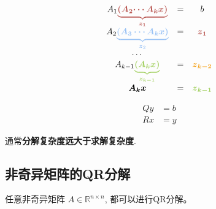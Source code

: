 \begin{example}[求解k个线性方程组 $ A_{1} A_{2} \cdots A_{k} x=b $]
    \begin{equation}\displaystyle \begin{matrix}
        A_{1}\textcolor[rgb]{0.72,0.33,0.31}{\boldsymbol{\underbrace{\boldsymbol{\textcolor[rgb]{0.72,0.33,0.31}{(}\textcolor[rgb]{0.72,0.33,0.31}{A}\textcolor[rgb]{0.72,0.33,0.31}{_{2}}\textcolor[rgb]{0.72,0.33,0.31}{\cdots A}\textcolor[rgb]{0.72,0.33,0.31}{_{k}}\textcolor[rgb]{0.72,0.33,0.31}{x}\textcolor[rgb]{0.72,0.33,0.31}{)}}}_{z_{1}}}} & = & b\\
        \textcolor[rgb]{0,0,0}{A}\textcolor[rgb]{0,0,0}{_{2}}\textcolor[rgb]{0.6,0.76,0.96}{\underbrace{\boldsymbol{( A_{3} \cdots A_{k} x)}}_{\boldsymbol{z_{2}}}} & = & \boldsymbol{\textcolor[rgb]{0.72,0.33,0.31}{z}\textcolor[rgb]{0.72,0.33,0.31}{_{1}}}\\
        \cdots  &  & \\
        A_{k-1}\textcolor[rgb]{0.63,0.81,0.37}{\boldsymbol{\underbrace{(\textcolor[rgb]{0.63,0.81,0.37}{A}\textcolor[rgb]{0.63,0.81,0.37}{_{k}}\textcolor[rgb]{0.63,0.81,0.37}{x}\textcolor[rgb]{0.63,0.81,0.37}{)}}_{z_{k-1}}}} & = & \boldsymbol{\textcolor[rgb]{0.96,0.65,0.14}{z}\textcolor[rgb]{0.96,0.65,0.14}{_{k-2}}}\\
        \boldsymbol{A_{k} x} & = & \boldsymbol{\textcolor[rgb]{0.63,0.81,0.37}{z}\textcolor[rgb]{0.63,0.81,0.37}{_{k-1}}}
        \end{matrix}\end{equation}
\end{example}

\begin{example}[QR分解$Ax = b$]
    \begin{equation}
\begin{aligned}
    Q y&=b\\
    R x&=y
\end{aligned}
\end{equation}
\end{example}

通常\textbf{分解复杂度远大于求解复杂度}.

\subsection{非奇异矩阵的QR分解}

\begin{theorem}
    任意非奇异矩阵 $ A \in \mathbb{R}^{n \times n} $, 都可以进行QR分解。
\end{theorem}

